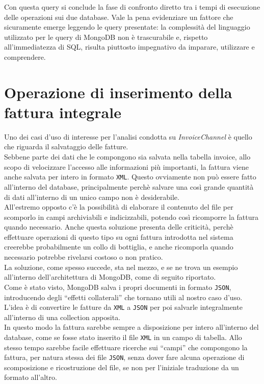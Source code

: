 \noindent Con questa query si conclude la fase di confronto diretto tra i tempi di esecuzione delle operazioni sui due database. Vale la pena evidenziare un fattore che sicuramente emerge leggendo le query presentate: la complessità del linguaggio utilizzato per le query di MongoDB non è trascurabile e, rispetto all'immediatezza di \gls{SQL}, risulta piuttosto impegnativo da imparare, utilizzare e comprendere.

\section{Operazione di inserimento della fattura integrale}
\label{sec:fattura-integrale}
Uno dei casi d'uso di interesse per l'analisi condotta su \textit{InvoiceChannel} è quello che riguarda il salvataggio delle fatture.\\
Sebbene parte dei dati che le compongono sia salvata nella tabella invoice, allo scopo di velocizzare l'accesso alle informazioni più importanti, la fattura viene anche salvata per intero in formato \texttt{XML}. Questo ovviamente non può essere fatto all'interno del database, principalmente perchè salvare una così grande quantità di dati all'interno di un unico campo non è desiderabile.\\
All'estremo opposto c'è la possibilità di elaborare il contenuto del file per scomporlo in campi archiviabili e indicizzabili, potendo così ricomporre la fattura quando necessario. Anche questa soluzione presenta delle criticità, perchè effettuare operazioni di questo tipo su ogni fattura introdotta nel sistema creerebbe probabilmente un collo di bottiglia, e anche ricomporla quando necessario potrebbe rivelarsi costoso o non pratico.\\

\noindent La soluzione, come spesso succede, sta nel mezzo, e se ne trova un esempio all'interno dell'architettura di MongoDB, come di seguito riportato.\\
Come è stato visto, MongoDB salva i propri documenti in formato \texttt{JSON}, introducendo degli ``effetti collaterali'' che tornano utili al nostro caso d'uso.\\
L'idea è di convertire le fatture da \texttt{XML} a \texttt{JSON} per poi salvarle integralmente all'interno di una collection apposita.\\
In questo modo la fattura sarebbe sempre a disposizione per intero all'interno del database, come se fosse stato inserito il file \texttt{XML} in un campo di tabella. Allo stesso tempo sarebbe facile effettuare ricerche sui ``campi'' che compongono la fattura, per natura stessa dei file \texttt{JSON}, senza dover fare alcuna operazione di scomposizione e ricostruzione del file, se non per l'iniziale traduzione da un formato all'altro.\\

